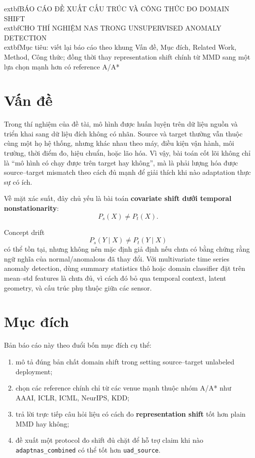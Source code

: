 \documentclass[a4paper]{article}
\begin{document}
\begin{center}
    	extbf{\Large BÁO CÁO ĐỀ XUẤT CẤU TRÚC VÀ CÔNG THỨC ĐO DOMAIN SHIFT}\\[0.2cm]
    	extbf{\Large CHO THÍ NGHIỆM NAS TRONG UNSUPERVISED ANOMALY DETECTION}\\[0.5cm]
    	extbf{Mục tiêu: viết lại báo cáo theo khung Vấn đề, Mục đích, Related Work, Method, Công thức; đồng thời thay representation shift chính từ MMD sang một lựa chọn mạnh hơn có reference A/A*}
\end{center}

\section{Vấn đề}

Trong thí nghiệm của đề tài, mô hình được huấn luyện trên dữ liệu nguồn và triển khai sang dữ liệu đích không có nhãn. Source và target thường vẫn thuộc cùng một họ hệ thống, nhưng khác nhau theo máy, điều kiện vận hành, môi trường, thời điểm đo, hiệu chuẩn, hoặc lão hóa. Vì vậy, bài toán cốt lõi không chỉ là ``mô hình có chạy được trên target hay không'', mà là phải lượng hóa được source--target mismatch theo cách đủ mạnh để giải thích khi nào adaptation thực sự có ích.

Về mặt xác suất, đây chủ yếu là bài toán \textbf{covariate shift dưới temporal nonstationarity}:
\[
P_s(X) \neq P_t(X).
\]

Concept drift
\[
P_s(Y \mid X) \neq P_t(Y \mid X)
\]
có thể tồn tại, nhưng không nên mặc định giả định nếu chưa có bằng chứng rằng ngữ nghĩa của normal/anomalous đã thay đổi. Với multivariate time series anomaly detection, dùng summary statistics thô hoặc domain classifier đặt trên mean--std features là chưa đủ, vì cách đó bỏ qua temporal context, latent geometry, và cấu trúc phụ thuộc giữa các sensor.

\section{Mục đích}

Bản báo cáo này theo đuổi bốn mục đích cụ thể:
\begin{enumerate}[label=\arabic*.]
    \item mô tả đúng bản chất domain shift trong setting source--target unlabeled deployment;
    \item chọn các reference chính chỉ từ các venue mạnh thuộc nhóm A/A* như AAAI, ICLR, ICML, NeurIPS, KDD;
    \item trả lời trực tiếp câu hỏi liệu có cách đo \textbf{representation shift} tốt hơn plain MMD hay không;
    \item đề xuất một protocol đo shift đủ chặt để hỗ trợ claim khi nào \texttt{adaptnas\_combined} có thể tốt hơn \texttt{uad\_source}.
\end{enumerate}
\end{document}
